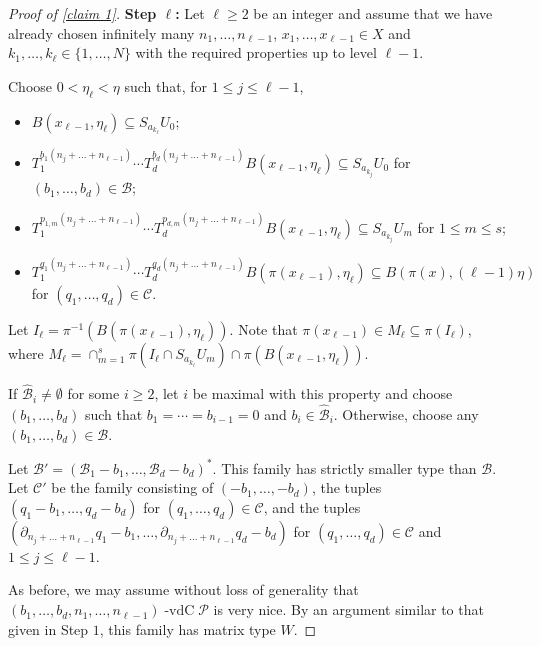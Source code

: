 \documentclass[10pt,a4paper]{amsart}
\newcommand{\cB}{{\mathcal B}}
\newcommand{\cC}{{\mathcal C}}
\newcommand{\cP}{{\mathcal P}}
\DeclareMathOperator{\vdc}{-vdC}
\begin{document}
\begin{proof}[Proof of \cref{claim 1}]
    \textbf{Step $\ell$:} Let $\ell\geq 2$ be an integer and assume that we have already chosen  infinitely many $n_1,\dots,n_{\ell-1}$, $x_1,\dots,x_{\ell-1}\in X$ and $k_1,\dots,k_{\ell}\in \{1,\dots,N\}$ with the required properties up to level $\ell-1$.

    Choose $0<\eta_\ell<\eta$ such that, for $1\leq j \leq \ell-1$,\begin{itemize}
        \item $B(x_{\ell-1},\eta_{\ell})\subseteq S_{a_{k_\ell}}U_0$;
        \item $T_1^{b_1(n_j+\dots+n_{\ell-1})}\cdots T_d^{b_d(n_j+\dots+n_{\ell-1})}B(x_{\ell-1},\eta_\ell)\subseteq S_{a_{k_j}}U_0$ for $(b_1,\dots,b_d)\in \cB$;
        \item $T_1^{p_{1,m}(n_j+\dots+n_{\ell-1})}\cdots T_d^{p_{d,m}(n_j+\dots+n_{\ell-1})}B(x_{\ell-1},\eta_\ell)\subseteq S_{a_{k_j}}U_m$ for $1\leq m \leq s$;
        \item $T_1^{q_1(n_j+\dots+n_{\ell-1})}\cdots T_d^{q_d(n_j+\dots+n_{\ell-1})}B(\pi(x_{\ell-1}),\eta_\ell)\subseteq B(\pi(x),(\ell-1)\eta)$ for $(q_1,\dots,q_d)\in \cC$.
    \end{itemize}

    Let $I_{\ell} = \pi^{-1}(B(\pi(x_{\ell-1}),\eta_\ell))$. Note that $\pi(x_{\ell-1})\in M_{\ell}\subseteq \pi(I_\ell)$, where $M_{\ell} = \cap_{m=1}^{s} \pi(I_\ell \cap S_{a_{k_\ell}}U_m) \cap \pi(B(x_{\ell-1},\eta_{\ell}))$.

    If $\widehat{\cB}_i\neq\emptyset$ for some $i\geq 2$, let $i$ be maximal with this property and choose $(b_1,\dots,b_d)$ such that $b_1=\cdots=b_{i-1}=0$ and $b_i\in \widehat{\cB}_i$. Otherwise, choose any $(b_1,\dots,b_d)\in \cB$.
    
    Let $\cB' = (\cB_1 -b_1,\dots,\cB_d-b_d)^*$. This family has strictly smaller type than $\cB$. Let $\cC'$ be the family consisting of $(-b_1,\dots,-b_d)$, the tuples $(q_1-b_1,\dots,q_d-b_d)$ for $(q_1,\dots,q_d)\in \cC$, and the tuples $(\partial_{n_j+\dots+n_{\ell-1}}q_1-b_1,\dots,\partial_{n_j+\dots+n_{\ell-1}}q_d-b_d)$ for $(q_1,\dots,q_d)\in \cC$ and $1\leq j \leq \ell-1$. 

    As before, we may assume without loss of generality that $(b_1,\dots,b_d,n_1,\dots,n_{\ell-1})\vdc\cP$ is very nice. By an argument similar to that given in Step $1$, this family has matrix type $W$.
    

\end{proof}
\end{document}
